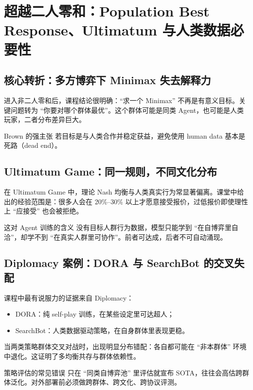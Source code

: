 \section{超越二人零和：Population Best Response、Ultimatum 与人类数据必要性}

\subsection{核心转折：多方博弈下 Minimax 失去解释力}
进入非二人零和后，课程结论很明确：``求一个 Minimax'' 不再是有意义目标。关键问题转为 ``你要对哪个群体最优''。这个群体可能是同类 Agent，也可能是人类玩家，二者分布差异巨大。

\begin{importantbox}{Brown 的强主张}
若目标是与人类合作并稳定获益，避免使用 human data 基本是死路（dead end）。
\end{importantbox}

\subsection{Ultimatum Game：同一规则，不同文化分布}
在 Ultimatum Game 中，理论 Nash 均衡与人类真实行为常显著偏离。课堂中给出的经验范围是：很多人会在 20\%--30\% 以上才愿意接受报价，过低报价即使理性上 ``应接受'' 也会被拒绝。

\begin{knowledgebox}{这对 Agent 训练的含义}
没有目标人群行为数据，模型只能学到 ``在自博弈里自洽''，却学不到 ``在真实人群里可协作''。前者可达成，后者不可自动涌现。
\end{knowledgebox}

\subsection{Diplomacy 案例：DORA 与 SearchBot 的交叉失配}
课程中最有说服力的证据来自 Diplomacy：
\begin{itemize}
    \item DORA：纯 self-play 训练，在某些设定里可达超人；
    \item SearchBot：人类数据驱动策略，在自身群体里表现更稳。
\end{itemize}
当两类策略群体交叉对战时，出现明显分布错配：各自都可能在 ``非本群体'' 环境中退化。这证明了多均衡共存与群体依赖性。

\begin{warningbox}{策略评估的常见错误}
只在 ``同类自博弈池'' 里评估就宣布 SOTA，往往会高估跨群体泛化。对外部署前必须做跨群体、跨文化、跨协议评测。
\end{warningbox}

